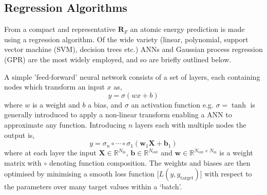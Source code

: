 \documentclass[main.tex]{subfiles}
\begin{document}

\subsection{Regression Algorithms}

From a compact and representative $\boldsymbol{R}_F$ an atomic energy prediction is made using a regression algorithm. Of the wide variety (linear, polynomial, support vector machine (SVM), decision trees etc.\cite{HandsOnML2019}) ANNs and Gaussian process regression (GPR) are the most widely employed,\cite{Mueller2020} and so are briefly outlined below.

A simple 'feed-forward' neural network consists of a set of layers, each containing nodes which transform an input $x$ as,
\begin{equation}
	y = \sigma(w x + b)
\end{equation}
where $w$ is a weight and $b$ a bias, and $\sigma$ an activation function e.g. $\sigma = \tanh$ is generally introduced to apply a non-linear transform enabling a ANN to approximate any function.\cite{Nielsen2015neural} Introducing $n$ layers each with multiple nodes the output is,
\begin{equation}
	y = \sigma_n \circ \cdots \circ \sigma_1(\boldsymbol{w}_1 \boldsymbol{X} + \boldsymbol{b}_1)
\end{equation}
where at each layer the input $\boldsymbol{X} \in \mathbb{R}^{N_\text{in}}$, $\boldsymbol{b} \in \mathbb{R}^{N_\text{out}}$ and $\boldsymbol{w} \in \mathbb{R}^{N_\text{out} \times N_\text{in}}$ is a weight matrix with $\circ$ denoting function composition. The weights and biases are then optimised by minimising a smooth loss function [$L(y, y_\text{target})$] with respect to the parameters over many target values within a `batch'. 
\end{document}
